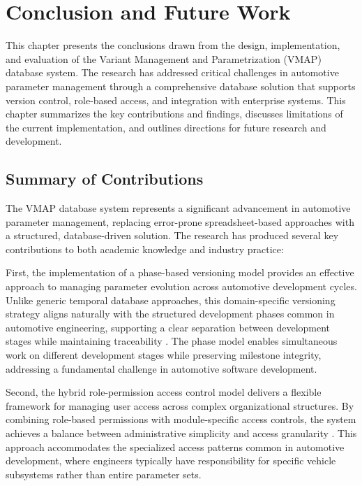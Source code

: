 \chapter{Conclusion and Future Work}
\label{chap:conclusion}

This chapter presents the conclusions drawn from the design, implementation, and evaluation of the Variant Management and Parametrization (VMAP) database system. The research has addressed critical challenges in automotive parameter management through a comprehensive database solution that supports version control, role-based access, and integration with enterprise systems. This chapter summarizes the key contributions and findings, discusses limitations of the current implementation, and outlines directions for future research and development.

\section{Summary of Contributions}
\label{sec:contributions-summary}

The \ac{VMAP} database system represents a significant advancement in automotive parameter management, replacing error-prone spreadsheet-based approaches with a structured, database-driven solution. The research has produced several key contributions to both academic knowledge and industry practice:

First, the implementation of a phase-based versioning model provides an effective approach to managing parameter evolution across automotive development cycles. Unlike generic temporal database approaches, this domain-specific versioning strategy aligns naturally with the structured development phases common in automotive engineering, supporting a clear separation between development stages while maintaining traceability \cite{broy2006challenges}. The phase model enables simultaneous work on different development stages while preserving milestone integrity, addressing a fundamental challenge in automotive software development.

Second, the hybrid role-permission access control model delivers a flexible framework for managing user access across complex organizational structures. By combining role-based permissions with module-specific access controls, the system achieves a balance between administrative simplicity and access granularity \cite{ferraiolo2011policy}. This approach accommodates the specialized access patterns common in automotive development, where engineers typically have responsibility for specific vehicle subsystems rather than entire parameter sets.

